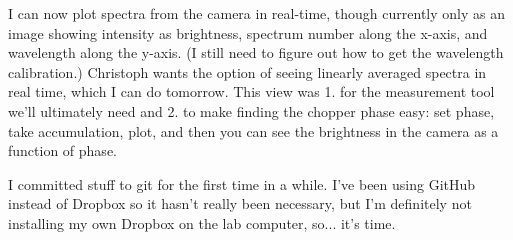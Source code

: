 \documentclass[11pt]{labbook}
\begin{document}
I can now plot spectra from the camera in real-time, though currently only as an image showing intensity as brightness, spectrum number along the x-axis, and wavelength along the y-axis. (I still need to figure out how to get the wavelength calibration.) Christoph wants the option of seeing linearly averaged spectra in real time, which I can do tomorrow. This view was 1. for the measurement tool we'll ultimately need and 2. to make finding the chopper phase easy: set phase, take accumulation, plot, and then you can see the brightness in the camera as a function of phase.

I committed stuff to git for the first time in a while. I've been using GitHub instead of Dropbox so it hasn't really been necessary, but I'm definitely not installing my own Dropbox on the lab computer, so... it's time.
\end{document}
